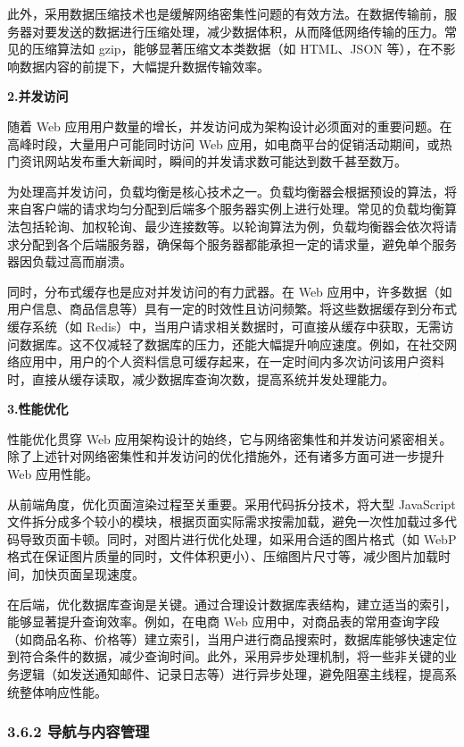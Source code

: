 此外，采用数据压缩技术也是缓解网络密集性问题的有效方法。在数据传输前，服务器对要发送的数据进行压缩处理，减少数据体积，从而降低网络传输的压力。常见的压缩算法如 gzip，能够显著压缩文本类数据（如 HTML、JSON 等），在不影响数据内容的前提下，大幅提升数据传输效率。

\textbf{2.并发访问}

随着 Web 应用用户数量的增长，并发访问成为架构设计必须面对的重要问题。在高峰时段，大量用户可能同时访问 Web 应用，如电商平台的促销活动期间，或热门资讯网站发布重大新闻时，瞬间的并发请求数可能达到数千甚至数万。

为处理高并发访问，负载均衡是核心技术之一。负载均衡器会根据预设的算法，将来自客户端的请求均匀分配到后端多个服务器实例上进行处理。常见的负载均衡算法包括轮询、加权轮询、最少连接数等。以轮询算法为例，负载均衡器会依次将请求分配到各个后端服务器，确保每个服务器都能承担一定的请求量，避免单个服务器因负载过高而崩溃。

同时，分布式缓存也是应对并发访问的有力武器。在 Web 应用中，许多数据（如用户信息、商品信息等）具有一定的时效性且访问频繁。将这些数据缓存到分布式缓存系统（如 Redis）中，当用户请求相关数据时，可直接从缓存中获取，无需访问数据库。这不仅减轻了数据库的压力，还能大幅提升响应速度。例如，在社交网络应用中，用户的个人资料信息可缓存起来，在一定时间内多次访问该用户资料时，直接从缓存读取，减少数据库查询次数，提高系统并发处理能力。

\textbf{3.性能优化}

性能优化贯穿 Web 应用架构设计的始终，它与网络密集性和并发访问紧密相关。除了上述针对网络密集性和并发访问的优化措施外，还有诸多方面可进一步提升 Web 应用性能。

从前端角度，优化页面渲染过程至关重要。采用代码拆分技术，将大型 JavaScript 文件拆分成多个较小的模块，根据页面实际需求按需加载，避免一次性加载过多代码导致页面卡顿。同时，对图片进行优化处理，如采用合适的图片格式（如 WebP 格式在保证图片质量的同时，文件体积更小）、压缩图片尺寸等，减少图片加载时间，加快页面呈现速度。

在后端，优化数据库查询是关键。通过合理设计数据库表结构，建立适当的索引，能够显著提升查询效率。例如，在电商 Web 应用中，对商品表的常用查询字段（如商品名称、价格等）建立索引，当用户进行商品搜索时，数据库能够快速定位到符合条件的数据，减少查询时间。此外，采用异步处理机制，将一些非关键的业务逻辑（如发送通知邮件、记录日志等）进行异步处理，避免阻塞主线程，提高系统整体响应性能。

\subsubsection{3.6.2 导航与内容管理}\label{ux5bfcux822aux4e0eux5185ux5bb9ux7ba1ux7406}

